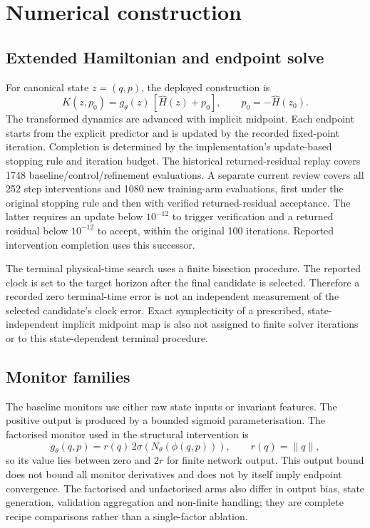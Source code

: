 \documentclass[11pt]{article}
\begin{document}
\section{Numerical construction}

\subsection{Extended Hamiltonian and endpoint solve}

For canonical state $z=(q,p)$, the deployed construction is
\[
 K(z,p_0)=g_\theta(z)\,[\widehat H(z)+p_0],
 \qquad p_0=-\widehat H(z_0).
\]
The transformed dynamics are advanced with implicit midpoint. Each endpoint
starts from the explicit predictor and is updated by the recorded fixed-point
iteration. Completion is determined by the implementation's update-based
stopping rule and iteration budget. The historical returned-residual replay
covers 1748 baseline/control/refinement evaluations. A separate current
review covers all 252 step interventions and 1080 new training-arm
evaluations, first under the original stopping rule and then with verified
returned-residual acceptance. The latter requires an update below
$10^{-12}$ to trigger verification and a returned residual below
$10^{-12}$ to accept, within the original 100 iterations. Reported
intervention completion uses this successor.

The terminal physical-time search uses a finite bisection procedure. The
reported clock is set to the target horizon after the final candidate is
selected. Therefore a recorded zero terminal-time error is not an
independent measurement of the selected candidate's clock error. Exact
symplecticity of a prescribed, state-independent implicit midpoint map is
also not assigned to finite solver iterations or to this state-dependent
terminal procedure.

\subsection{Monitor families}

The baseline monitors use either raw state inputs or invariant features. The
positive output is produced by a bounded sigmoid parameterisation. The
factorised monitor used in the structural intervention is
\[
 g_\theta(q,p)=r(q)\,2\sigma\!\left(N_\theta(\phi(q,p))\right),
 \qquad r(q)=\lVert q\rVert,
\]
so its value lies between zero and $2r$ for finite network output. This
output bound does not bound all monitor derivatives and does not by itself
imply endpoint convergence. The factorised and unfactorised arms also differ
in output bias, state generation, validation aggregation and non-finite
handling; they are complete recipe comparisons rather than a single-factor
ablation.
\end{document}
